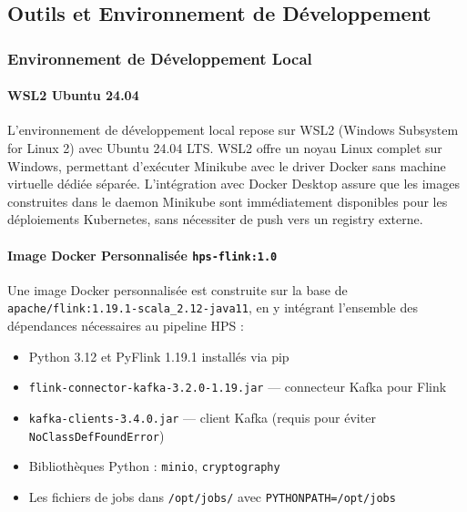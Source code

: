 \subsection{Outils et Environnement de Développement}
\vspace{0.3cm}

\subsubsection{Environnement de Développement Local}
\vspace{0.3cm}

\paragraph{WSL2 Ubuntu 24.04}
\vspace{0.3cm}
L'environnement de développement local repose sur WSL2 (Windows Subsystem for Linux 2) avec Ubuntu 24.04 LTS. WSL2 offre un noyau Linux complet sur Windows, permettant d'exécuter Minikube avec le driver Docker sans machine virtuelle dédiée séparée. L'intégration avec Docker Desktop assure que les images construites dans le daemon Minikube sont immédiatement disponibles pour les déploiements Kubernetes, sans nécessiter de push vers un registry externe.

\vspace{0.3cm}
\paragraph{Image Docker Personnalisée \texttt{hps-flink:1.0}}
\vspace{0.3cm}
Une image Docker personnalisée est construite sur la base de \texttt{apache/flink:1.19.1-scala\_2.12-java11}, en y intégrant l'ensemble des dépendances nécessaires au pipeline HPS :
\begin{itemize}
    \item Python 3.12 et PyFlink 1.19.1 installés via pip
    \item \texttt{flink-connector-kafka-3.2.0-1.19.jar} --- connecteur Kafka pour Flink
    \item \texttt{kafka-clients-3.4.0.jar} --- client Kafka (requis pour éviter \texttt{NoClassDefFoundError})
    \item Bibliothèques Python : \texttt{minio}, \texttt{cryptography}
    \item Les fichiers de jobs dans \texttt{/opt/jobs/} avec \texttt{PYTHONPATH=/opt/jobs}
\end{itemize}

